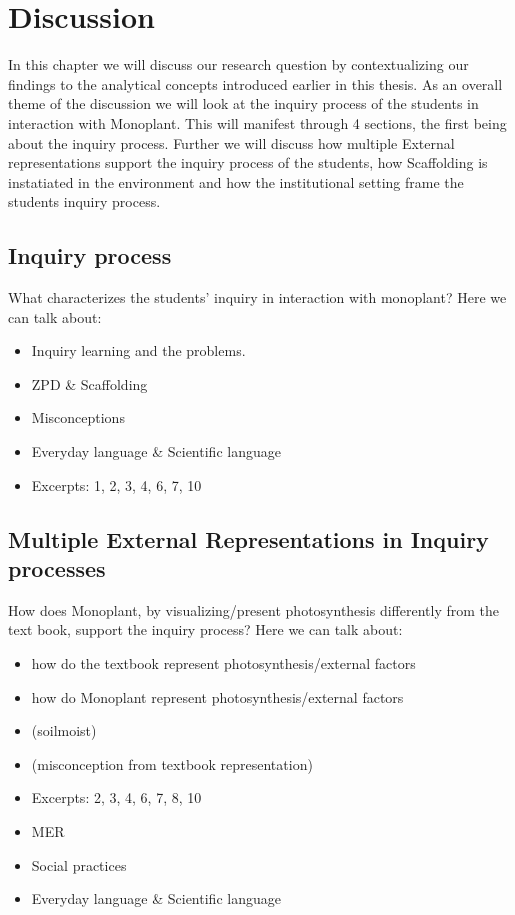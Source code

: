 \chapter{Discussion}
In this chapter we will discuss our research question by contextualizing our findings to the analytical concepts introduced earlier in this thesis. As an overall theme of the discussion we will look at the inquiry process of the students in interaction with Monoplant. This will manifest through 4 sections, the first being about the inquiry process. Further we will discuss how multiple External representations support the inquiry process of the students, how Scaffolding is instatiated in the environment and how the institutional setting frame the students inquiry process.

\section{Inquiry process}
What characterizes the students’ inquiry in interaction with monoplant?
Here we can talk about: 
\begin{itemize}
\item{Inquiry learning and the problems. \citep{de1998scientific}}
\item{ZPD \& Scaffolding}
\item{Misconceptions}
\item{Everyday language \& Scientific language}
\item{Excerpts: 1, 2, 3, 4, 6, 7, 10}
\end{itemize}



\section{Multiple External Representations in Inquiry processes}
How does Monoplant, by visualizing/present photosynthesis differently from the text book, support the inquiry process? 
Here we can talk about: 
\begin{itemize}
\item{how do the textbook represent photosynthesis/external factors}
\item{how do Monoplant represent photosynthesis/external factors}
\item{ (soilmoist)}
\item{ (misconception from textbook representation)}
\item{Excerpts: 2, 3, 4, 6, 7, 8, 10}
\item{MER}
\item{Social practices}
\item{Everyday language \& Scientific language}
\end{itemize}




